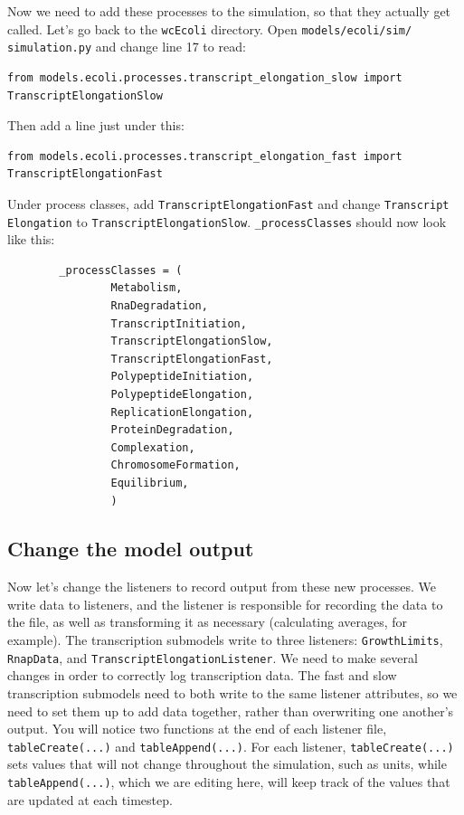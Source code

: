 \documentclass[12pt]{article}
\begin{document}
Now we need to add these processes to the simulation, so that they actually get called. Let's go back to the \texttt{wcEcoli} directory. Open \texttt{models/ecoli/sim/ \allowbreak simulation.py} and change line 17 to read: 

\lstset{language=Python}
\begin{lstlisting}
from models.ecoli.processes.transcript_elongation_slow import TranscriptElongationSlow
\end{lstlisting}

Then add a line just under this:

\begin{lstlisting}
from models.ecoli.processes.transcript_elongation_fast import TranscriptElongationFast
\end{lstlisting}

Under process classes, add \texttt{TranscriptElongationFast} and change \texttt{Transcript \allowbreak Elongation} to \texttt{TranscriptElongationSlow}. \texttt{\_processClasses} should now look like this:


\begin{lstlisting}
        _processClasses = (
                Metabolism,
                RnaDegradation,
                TranscriptInitiation,
                TranscriptElongationSlow,
                TranscriptElongationFast,
                PolypeptideInitiation,
                PolypeptideElongation,
                ReplicationElongation,
                ProteinDegradation,
                Complexation,
                ChromosomeFormation,
                Equilibrium,
                )
\end{lstlisting}

\subsection{Change the model output}

Now let's change the listeners to record output from these new processes. We write data to listeners, and the listener is responsible for recording the data to the file, as well as transforming it as necessary (calculating averages, for example). The transcription submodels write to three listeners: \texttt{GrowthLimits}, \texttt{RnapData}, and \texttt{TranscriptElongationListener}. We need to make several changes in order to correctly log transcription data. The fast and slow transcription submodels need to both write to the same listener attributes, so we need to set them up to add data together, rather than overwriting one another's output. You will notice two functions at the end of each listener file, \texttt{tableCreate(...)} and \texttt{tableAppend(...)}. For each listener, \texttt{tableCreate(...)} sets values that will not change throughout the simulation, such as units, while \texttt{tableAppend(...)}, which we are editing here, will keep track of the values that are updated at each timestep.
\end{document}
